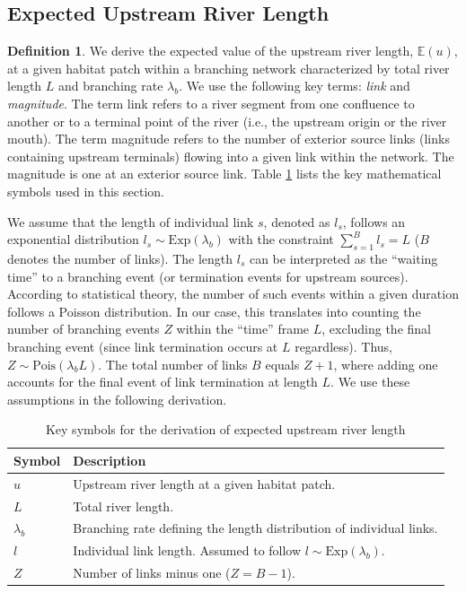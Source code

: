 \documentclass[11pt, class=article, crop=false]{standalone}
\theoremstyle{definition}
\newtheorem{definition}{Definition}[subsection]
\begin{document}
\newpage

\subsection{Expected Upstream River Length} \label{updist}

\begin{definition}
We derive the expected value of the upstream river length, $\mathbb{E}(u)$, at a given habitat patch within a branching network characterized by total river length $L$ and branching rate $\lambda_b$.
We use the following key terms: \textit{link} and \textit{magnitude}.
The term link refers to a river segment from one confluence to another or to a terminal point of the river (i.e., the upstream origin or the river mouth).
The term magnitude refers to the number of exterior source links (links containing upstream terminals) flowing into a given link within the network.
The magnitude is one at an exterior source link.
Table \ref{tab:key-symbol} lists the key mathematical symbols used in this section.

We assume that the length of individual link $s$, denoted as $l_s$, follows an exponential distribution $l_s \sim \mbox{Exp}(\lambda_b)$ with the constraint $\sum_{s = 1}^{B} l_s = L$ ($B$ denotes the number of links).
The length $l_s$ can be interpreted as the ``waiting time'' to a branching event (or termination events for upstream sources).
According to statistical theory, the number of such events within a given duration follows a Poisson distribution.
In our case, this translates into counting the number of branching events $Z$ within the ``time'' frame $L$, excluding the final branching event (since link termination occurs at $L$ regardless).
Thus, $Z \sim \mbox{Pois}(\lambda_b L)$.
The total number of links $B$ equals $Z + 1$, where adding one accounts for the final event of link termination at length $L$.
We use these assumptions in the following derivation.

\begin{table}
    \centering
    \caption{Key symbols for the derivation of expected upstream river length}
    \begin{tabularx}{\textwidth}{ll}
        Symbol & Description\\
        \hline
        $u$ & Upstream river length at a given habitat patch.\\
        $L$ & Total river length.\\
        $\lambda_b$ & Branching rate defining the length distribution of individual links.\\
        $l$ & Individual link length. Assumed to follow $l \sim \mbox{Exp}(\lambda_b)$.\\
        $Z$ & Number of links minus one ($Z = B - 1$).\\
        \hline
    \end{tabularx}
    \label{tab:key-symbol}
\end{table}

\end{definition}
\end{document}
